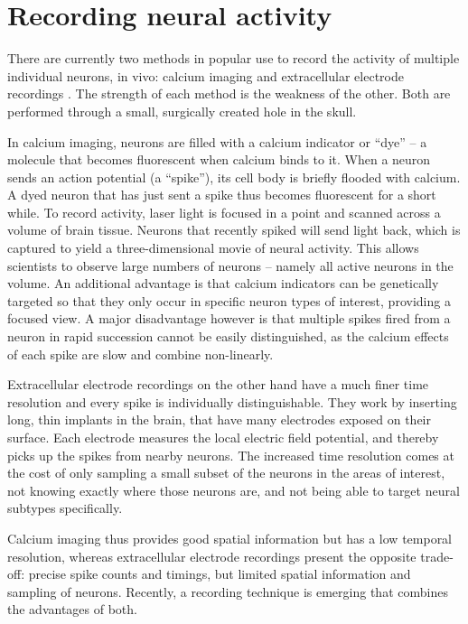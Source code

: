 \section{Recording neural activity}

There are currently two methods in popular use to record the activity of multiple individual neurons, in vivo: calcium imaging and extracellular electrode recordings \cite{Carter2015GuideResearchTechniques,Scanziani2009ElectrophysiologyAgeLight}. The strength of each method is the weakness of the other. Both are performed through a small, surgically created hole in the skull.

In calcium imaging, neurons are filled with a calcium indicator or “dye” – a molecule that becomes fluorescent when calcium binds to it. When a neuron sends an action potential (a “spike”), its cell body is briefly flooded with calcium. A dyed neuron that has just sent a spike thus becomes fluorescent for a short while. To record activity, laser light is focused in a point and scanned across a volume of brain tissue. Neurons that recently spiked will send light back, which is captured to yield a three-dimensional movie of neural activity. This allows scientists to observe large numbers of neurons – namely all active neurons in the volume. An additional advantage is that calcium indicators can be genetically targeted so that they only occur in specific neuron types of interest, providing a focused view. A major disadvantage however is that multiple spikes fired from a neuron in rapid succession cannot be easily distinguished, as the calcium effects of each spike are slow and combine non-linearly.

Extracellular electrode recordings on the other hand have a much finer time resolution and every spike is individually distinguishable. They work by inserting long, thin implants in the brain, that have many electrodes exposed on their surface. Each electrode measures the local electric field potential, and thereby picks up the spikes from nearby neurons. The increased time resolution comes at the cost of only sampling a small subset of the neurons in the areas of interest, not knowing exactly where those neurons are, and not being able to target neural subtypes specifically.

Calcium imaging thus provides good spatial information but has a low temporal resolution, whereas extracellular electrode recordings present the opposite trade-off: precise spike counts and timings, but limited spatial information and sampling of neurons. Recently, a recording technique is emerging that combines the advantages of both.


